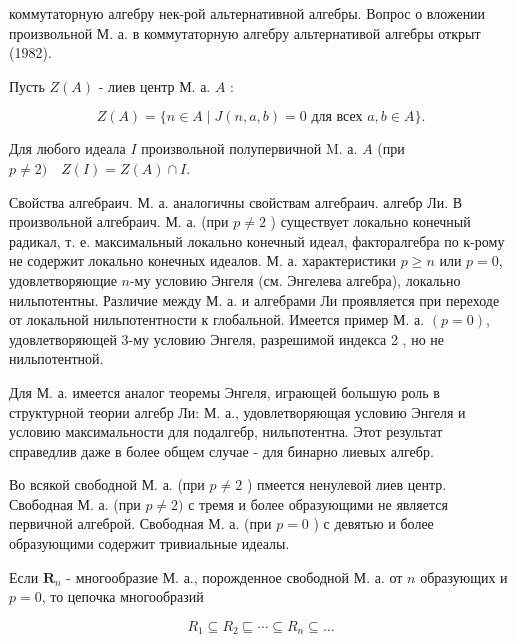 \documentclass[10pt]{article}
\begin{document}
коммутаторную алгебру нек-рой альтернативной алгебры. Вопрос о вложении произвольной М. а. в коммутаторную алгебру альтернативой алгебры открыт (1982).



Пусть $Z(A)$ - лиев центр М. а. $A$ :



\[

Z(A)=\{n \in A \mid J(n, a, b)=0 \text { для всех } a, b \in A\} .

\]



Для любого идеала $I$ произвольной полупервичной M. а. $A$ (при $p \neq 2) \quad Z(I)=Z(A) \cap I$.



Свойства алгебраич. М. а. аналогичны свойствам алгебраич. алгебр Ли. В произвольной алгебраич. М. а. (при $p \neq 2$ ) существует локально конечный радикал, т. е. максимальный локально конечный идеал, факторалгебра по к-рому не содержит локально конечных идеалов. М. а. характеристики $p \geqslant n$ или $p=0$, удовлетворяющие $n$-му условию Энгеля (см. Энгелева алгебра), локально нильпотентны. Различие между М. а. и алгебрами Ли проявляется при переходе от локальной нильпотентности к глобальной. Имеется пример М. а. $(p=0)$, удовлетворяющей 3-му условию Энгеля, разрешимой индекса 2 , но не нильпотентной.



Для М. а. имеется аналог теоремы Энгеля, играющей большую роль в структурной теории алгебр Ли: М. а., удовлетворяющая условию Энгеля и условию максимальности для подалгебр, нильпотентна. Этот результат справедлив даже в более общем случае - для бинарно лиевых алгебр.



Во всякой свободной М. а. (при $p \neq 2$ ) пмеется ненулевой лиев центр. Свободная М. а. (при $p \neq 2)$ с тремя и более образующими не является первичной алгеброй. Свободная М. а. (при $p=0$ ) с девятью и более образующими содержит тривиальные идеалы.



Если $\boldsymbol{R}_{n}$ - многообразие М. а., порожденное свободной М. а. от $n$ образующих и $p=0$, то цепочка многообразий



\[

R_{1} \subseteq R_{2} \sqsubseteq \cdots \subseteq R_{n} \subseteq \ldots

\]
\end{document}
